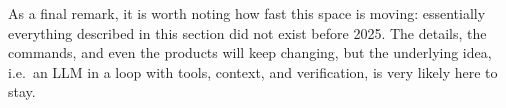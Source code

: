 As a final remark, it is worth noting how fast this space is moving: essentially everything described in this section
did not exist before 2025. The details, the commands, and even the products will keep changing, but the underlying
idea, i.e.\ an LLM in a loop with tools, context, and verification, is very likely here to stay.